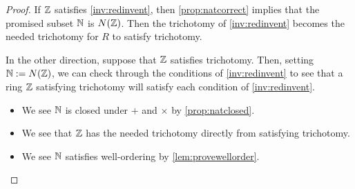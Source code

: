 \documentclass{article}
\begin{document}
\begin{proof}
	If $\mathbb Z$ satisfies \autoref{inv:redinvent}, then \autoref{prop:natcorrect} implies that the promised subset $\mathbb N$ is $N(\mathbb Z)$. Then the trichotomy of \autoref{inv:redinvent} becomes the needed trichotomy for $R$ to satisfy trichotomy.

	In the other direction, suppose that $\mathbb Z$ satisfies trichotomy. Then, setting $\mathbb N:=N(\mathbb Z)$, we can check through the conditions of \autoref{inv:redinvent} to see that a ring $\mathbb Z$ satisfying trichotomy will satisfy each condition of \autoref{inv:redinvent}.
	\begin{itemize}
		\item We see $\mathbb N$ is closed under $+$ and $\times$ by \autoref{prop:natclosed}.
		\item We see that $\mathbb Z$ has the needed trichotomy directly from satisfying trichotomy.
		\item We see $\mathbb N$ satisfies well-ordering by \autoref{lem:provewellorder}.
		\qedhere
	\end{itemize}
\end{proof}
\end{document}
